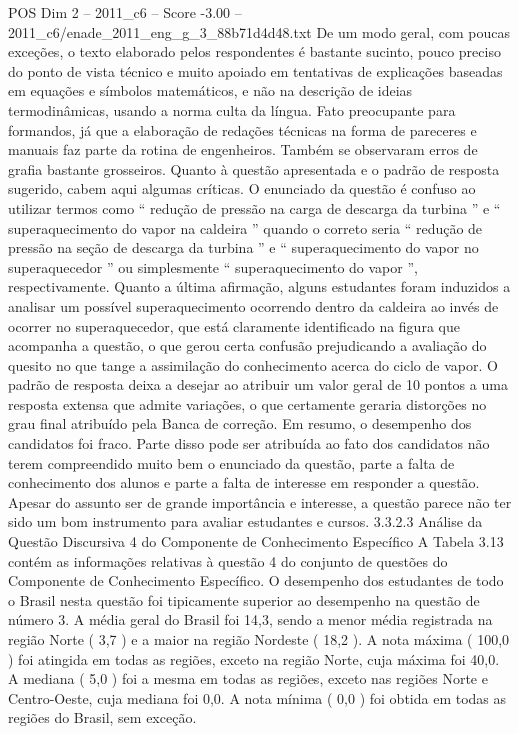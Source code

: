\begin{textsample}{POS Dim 2 – 2011\_c6 – Score -3.00 – 2011\_c6/enade\_2011\_eng\_g\_3\_88b71d4d48.txt}
De um modo geral, com poucas exceções, o texto elaborado pelos respondentes é bastante sucinto, pouco preciso do ponto de vista técnico e muito apoiado em tentativas de explicações baseadas em equações e símbolos matemáticos, e não na descrição de ideias termodinâmicas, usando a norma culta da língua.
Fato preocupante para formandos, já que a elaboração de redações técnicas na forma de pareceres e manuais faz parte da rotina de engenheiros.
Também se observaram erros de grafia bastante grosseiros.
Quanto à questão apresentada e o padrão de resposta sugerido, cabem aqui algumas críticas.
O enunciado da questão é confuso ao utilizar termos como “ redução de pressão na carga de descarga da turbina ” e “ superaquecimento do vapor na caldeira ” quando o correto seria “ redução de pressão na seção de descarga da turbina ” e “ superaquecimento do vapor no superaquecedor ” ou simplesmente “ superaquecimento do vapor ”, respectivamente.
Quanto a última afirmação, alguns estudantes foram induzidos a analisar um possível superaquecimento ocorrendo dentro da caldeira ao invés de ocorrer no superaquecedor, que está claramente identificado na figura que acompanha a questão, o que gerou certa confusão prejudicando a avaliação do quesito no que tange a assimilação do conhecimento acerca do ciclo de vapor.
O padrão de resposta deixa a desejar ao atribuir um valor geral de 10 pontos a uma resposta extensa que admite variações, o que certamente geraria distorções no grau final atribuído pela Banca de correção.
Em resumo, o desempenho dos candidatos foi fraco.
Parte disso pode ser atribuída ao fato dos candidatos não terem compreendido muito bem o enunciado da questão, parte a falta de conhecimento dos alunos e parte a falta de interesse em responder a questão.
Apesar do assunto ser de grande importância e interesse, a questão parece não ter sido um bom instrumento para avaliar estudantes e cursos. 3.3.2.3 Análise da Questão Discursiva 4 do Componente de Conhecimento Específico A Tabela 3.13 contém as informações relativas à questão 4 do conjunto de questões do Componente de Conhecimento Específico.
O desempenho dos estudantes de todo o Brasil nesta questão foi tipicamente superior ao desempenho na questão de número 3.
A média geral do Brasil foi 14,3, sendo a menor média registrada na região Norte ( 3,7 ) e a maior na região Nordeste ( 18,2 ).
A nota máxima ( 100,0 ) foi atingida em todas as regiões, exceto na região Norte, cuja máxima foi 40,0.
A mediana ( 5,0 ) foi a mesma em todas as regiões, exceto nas regiões Norte e Centro-Oeste, cuja mediana foi 0,0.
A nota mínima ( 0,0 ) foi obtida em todas as regiões do Brasil, sem exceção.

\end{textsample}

